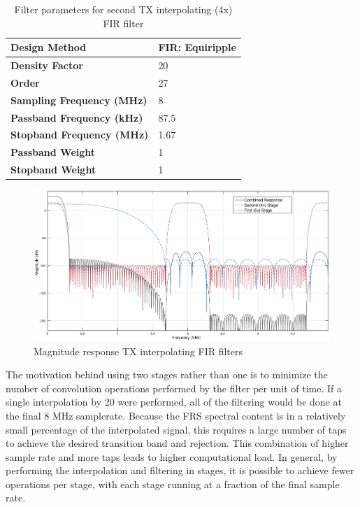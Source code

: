\begin{table}[h]
  \centering
  \caption{Filter parameters for second TX interpolating (4x) FIR filter}
  \label{tab:tx_interp_fir2}
  \footnotesize
  \begin{tabular} {|l|l|}
    \hline
    \textbf{Design Method}              & FIR: Equiripple \\ \hline
    \textbf{Density Factor}             & 20              \\ \hline
    \textbf{Order}                      & 27              \\ \hline
    \textbf{Sampling Frequency (MHz)}   & 8               \\ \hline
    \textbf{Passband Frequency (kHz)}   & 87.5            \\ \hline
    \textbf{Stopband Frequency (MHz)}   & 1.67            \\ \hline
    \textbf{Passband Weight}            & 1               \\ \hline
    \textbf{Stopband Weight}            & 1               \\ \hline
  \end{tabular}
\end{table}

\begin{figure}[h]
  \centering
  \includegraphics[width=6.5in]{images/frs/filter/tx/interp-firs.eps}
  \caption{Magnitude response TX interpolating FIR filters}
  \label{fig:tx_interp_firs}
\end{figure}

The motivation behind using two stages rather than one is to minimize the
number of convolution operations performed by the filter per unit of time.
If a single interpolation by 20 were performed, all of the filtering would
be done at the final 8 MHz samplerate. Because the \ac{FRS} spectral content is in a relatively
small percentage of the interpolated signal, this requires a large number
of taps to achieve the desired transition band and rejection. This combination
of higher sample rate and more taps leads to higher computational load.
In general, by performing the interpolation and filtering in stages, it is
possible to achieve fewer operations per stage, with each stage running at a
fraction of the final sample rate.

